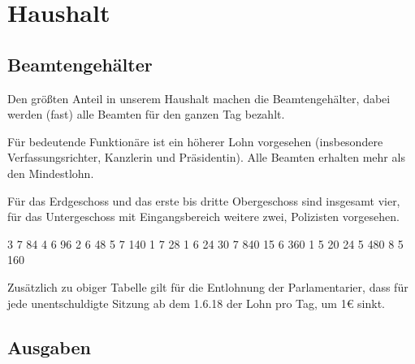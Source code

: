 \documentclass{sasbase}
\begin{document}
\newpage

\section{Haushalt}

\subsection{Beamtengehälter}

Den größten Anteil in unserem Haushalt machen die Beamtengehälter, dabei werden (fast) alle
Beamten für den ganzen Tag bezahlt.

Für bedeutende Funktionäre ist ein höherer Lohn vorgesehen (insbesondere Verfassungsrichter, Kanzlerin und Präsidentin). Alle Beamten erhalten mehr als den Mindestlohn.

Für das Erdgeschoss und das erste bis dritte Obergeschoss sind insgesamt vier, für das Untergeschoss
mit Eingangsbereich weitere zwei, Polizisten vorgesehen.

\vspace{5mm}

\begin{lohnrechnung}
     {3}  {7} {84}
     {4}  {6} {96}
           {2}  {6} {48}
               {5}  {7} {140}
              {1}  {7} {28}
            {1}  {6} {24}
            {30} {7} {840}
        {15} {6} {360}
            {1}  {5} {20}
         {24} {5} {480}
                   {8}  {5} {160}
\end{lohnrechnung}

\addtocounter{beamten}{\thetotal}

\vspace{5mm}

Zusätzlich zu obiger Tabelle gilt für die Entlohnung der Parlamentarier, dass für jede
unentschuldigte Sitzung ab dem 1.6.18 der Lohn pro Tag, um 1€ sinkt.

\subsection{Ausgaben}

\begin{kostenrechnung}
\end{kostenrechnung}
\end{document}
